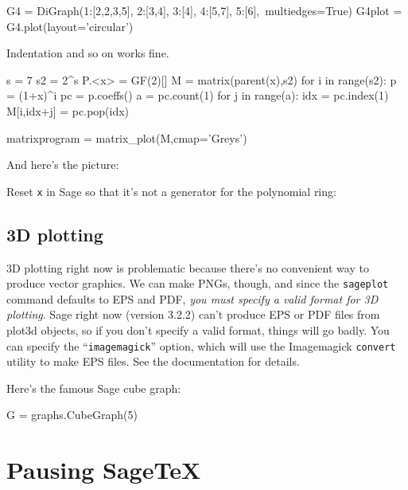 \documentclass{article}
\begin{document}

\begin{sageblock}
G4 = DiGraph({1:[2,2,3,5], 2:[3,4], 3:[4], 4:[5,7], 5:[6]},\
             multiedges=True)
G4plot = G4.plot(layout='circular')
\end{sageblock}


Indentation and so on works fine.
\begin{sageblock}
 s     = 7
 s2    = 2^s
 P.<x> = GF(2)[]
 M     = matrix(parent(x),s2)
 for i in range(s2):
    p  = (1+x)^i
    pc = p.coeffs()
    a  = pc.count(1)
    for j in range(a):
        idx        = pc.index(1)
        M[i,idx+j] = pc.pop(idx)

 matrixprogram = matrix_plot(M,cmap='Greys')
\end{sageblock}
And here's the picture:


Reset \texttt{x} in Sage so that it's not a generator for the polynomial
ring: \sage{var('x')}

\subsection{3D plotting}

3D plotting right now is problematic because there's no convenient way
to produce vector graphics. We can make PNGs, though, and since the
\verb|sageplot| command defaults to EPS and PDF, \emph{you must specify
a valid format for 3D plotting}. Sage right now (version 3.2.2) can't
produce EPS or PDF files from plot3d objects, so if you don't specify a
valid format, things will go badly. You can specify the
``\texttt{imagemagick}'' option, which will use the Imagemagick
\texttt{convert} utility to make EPS files. See the documentation for
details.

Here's the famous Sage cube graph:

\begin{sageblock}
  G = graphs.CubeGraph(5)
\end{sageblock}


\section{Pausing Sage\TeX}
\label{sec:pausing-sagetex}
\end{document}
